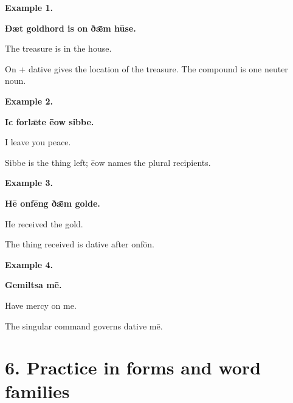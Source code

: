\textbf{Example 1.}

\textbf{Ðæt goldhord is on ðǣm hūse.}

The treasure is in the house.

On + dative gives the location of the treasure. The compound is one neuter noun.

\textbf{Example 2.}

\textbf{Ic forlǣte ēow sibbe.}

I leave you peace.

Sibbe is the thing left; ēow names the plural recipients.

\textbf{Example 3.}

\textbf{Hē onfēng ðǣm golde.}

He received the gold.

The thing received is dative after onfōn.

\textbf{Example 4.}

\textbf{Gemiltsa mē.}

Have mercy on me.

The singular command governs dative mē.

\section*{6. Practice in forms and word families}

